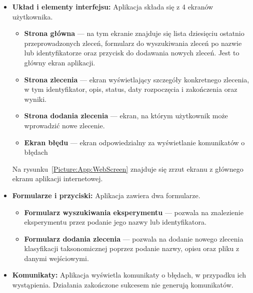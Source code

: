                 \begin{itemize}
                    \item {
                        \textbf{Układ i elementy interfejsu:}
                        Aplikacja składa się z 4 ekranów użytkownika.
                        \begin{itemize}
                            \item {
                                \textbf{Strona główna} — na tym ekranie znajduje się lista dziesięciu ostatnio przeprowadzonych zleceń, formularz do wyszukiwania zleceń po nazwie lub identyfikatorze oraz przycisk do dodawania nowych zleceń. Jest to główny ekran aplikacji.
                            }
                            \item {
                                \textbf{Strona zlecenia} — ekran wyświetlający szczegóły konkretnego zlecenia, w tym identyfikator, opis, status, daty rozpoczęcia i zakończenia oraz wyniki.
                            }
                            \item {
                                \textbf{Strona dodania zlecenia} — ekran, na którym użytkownik może wprowadzić nowe zlecenie. 
                            }
                            \item {
                                \textbf{Ekran błędu} — ekran odpowiedzialny za wyświetlanie komunikatów o błędach
                            }
                        \end{itemize}
                        Na rysunku~\ref{Picture:App:WebScreen} znajduje się zrzut ekranu z głównego ekranu aplikacji internetowej.
                    }
                    \item {
                        \textbf{Formularze i przyciski:}
                        Aplikacja zawiera dwa formularze.
                        \begin{itemize}
                            \item {
                                \textbf{Formularz wyszukiwania eksperymentu} — pozwala na znalezienie eksperymentu przez podanie jego nazwy lub identyfikatora.
                            }
                            \item {
                                \textbf{Formularz dodania zlecenia} — pozwala na dodanie nowego zlecenia klasyfikacji taksonomicznej poprzez podanie nazwy, opisu oraz pliku z danymi wejściowymi.
                            }
                        \end{itemize}
                    }
                    \item {
                        \textbf{Komunikaty:}
                        Aplikacja wyświetla komunikaty o błędach, w przypadku ich wystąpienia. Działania zakończone sukcesem nie generują komunikatów.
                    }
                \end{itemize}

